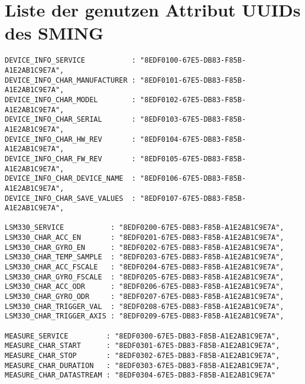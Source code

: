 \section{Liste der genutzen Attribut UUIDs des SMING}
\begin{lstlisting}
DEVICE_INFO_SERVICE           : "8EDF0100-67E5-DB83-F85B-A1E2AB1C9E7A",
DEVICE_INFO_CHAR_MANUFACTURER : "8EDF0101-67E5-DB83-F85B-A1E2AB1C9E7A",
DEVICE_INFO_CHAR_MODEL        : "8EDF0102-67E5-DB83-F85B-A1E2AB1C9E7A",
DEVICE_INFO_CHAR_SERIAL       : "8EDF0103-67E5-DB83-F85B-A1E2AB1C9E7A",
DEVICE_INFO_CHAR_HW_REV       : "8EDF0104-67E5-DB83-F85B-A1E2AB1C9E7A",
DEVICE_INFO_CHAR_FW_REV       : "8EDF0105-67E5-DB83-F85B-A1E2AB1C9E7A",
DEVICE_INFO_CHAR_DEVICE_NAME  : "8EDF0106-67E5-DB83-F85B-A1E2AB1C9E7A",
DEVICE_INFO_CHAR_SAVE_VALUES  : "8EDF0107-67E5-DB83-F85B-A1E2AB1C9E7A",

LSM330_SERVICE           : "8EDF0200-67E5-DB83-F85B-A1E2AB1C9E7A",
LSM330_CHAR_ACC_EN       : "8EDF0201-67E5-DB83-F85B-A1E2AB1C9E7A",
LSM330_CHAR_GYRO_EN      : "8EDF0202-67E5-DB83-F85B-A1E2AB1C9E7A",
LSM330_CHAR_TEMP_SAMPLE  : "8EDF0203-67E5-DB83-F85B-A1E2AB1C9E7A",
LSM330_CHAR_ACC_FSCALE   : "8EDF0204-67E5-DB83-F85B-A1E2AB1C9E7A",
LSM330_CHAR_GYRO_FSCALE  : "8EDF0205-67E5-DB83-F85B-A1E2AB1C9E7A",
LSM330_CHAR_ACC_ODR      : "8EDF0206-67E5-DB83-F85B-A1E2AB1C9E7A",
LSM330_CHAR_GYRO_ODR     : "8EDF0207-67E5-DB83-F85B-A1E2AB1C9E7A",
LSM330_CHAR_TRIGGER_VAL  : "8EDF0208-67E5-DB83-F85B-A1E2AB1C9E7A",
LSM330_CHAR_TRIGGER_AXIS : "8EDF0209-67E5-DB83-F85B-A1E2AB1C9E7A",

MEASURE_SERVICE         : "8EDF0300-67E5-DB83-F85B-A1E2AB1C9E7A",
MEASURE_CHAR_START      : "8EDF0301-67E5-DB83-F85B-A1E2AB1C9E7A",
MEASURE_CHAR_STOP       : "8EDF0302-67E5-DB83-F85B-A1E2AB1C9E7A",
MEASURE_CHAR_DURATION   : "8EDF0303-67E5-DB83-F85B-A1E2AB1C9E7A",
MEASURE_CHAR_DATASTREAM : "8EDF0304-67E5-DB83-F85B-A1E2AB1C9E7A"
\end{lstlisting}